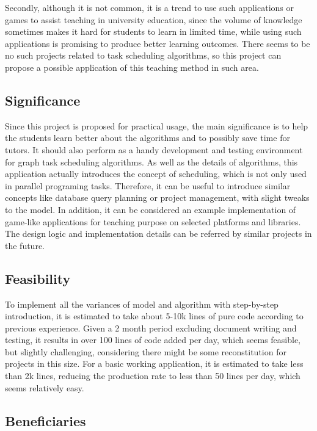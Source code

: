 \documentclass[a4paper,11pt]{article}
\begin{document}
Secondly, although it is not common, it is a trend to use such applications or games to assist teaching in university education, since the volume of knowledge sometimes makes it hard for students to learn in limited time, while using such applications is promising to produce better learning outcomes. There seems to be no such projects related to task scheduling algorithms, so this project can propose a possible application of this teaching method in such area.

\subsection{Significance} \label{sec:sig}

Since this project is proposed for practical usage, the main significance is to help the students learn better about the algorithms and to possibly save time for tutors. It should also perform as a handy development and testing environment for graph task scheduling algorithms. As well as the details of algorithms, this application actually introduces the concept of scheduling, which is not only used in parallel programing tasks. Therefore, it can be useful to introduce similar concepts like database query planning or project management, with slight tweaks to the model. In addition, it can be considered an example implementation of game-like applications for teaching purpose on selected platforms and libraries. The design logic and implementation details can be referred by similar projects in the future.

\subsection{Feasibility}

To implement all the variances of model and algorithm with step-by-step introduction, it is estimated to take about 5-10k lines of pure code according to previous experience. Given a 2 month period excluding document writing and testing, it results in over 100 lines of code added per day, which seems feasible, but slightly challenging, considering there might be some reconstitution for projects in this size. For a basic working application, it is estimated to take less than 2k lines, reducing the production rate to less than 50 lines per day, which seems relatively easy.

\subsection{Beneficiaries}
\end{document}
